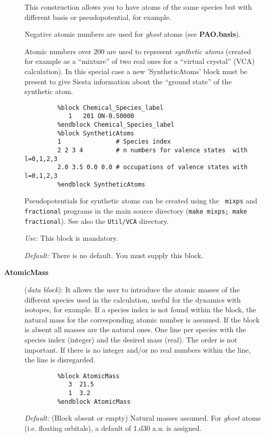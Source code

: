 \documentclass[11pt]{article}
\begin{document}
\begin{description}
This construction allows you to have atoms of the same species but with
different basis or pseudopotential, for example.

Negative atomic numbers are used for {\it ghost} atoms 
(see {\bf PAO.basis}).

Atomic numbers over 200 are used to represent {\it synthetic atoms}
 (created for example as a ``mixture'' of two
real ones for a ``virtual crystal'' (VCA) calculation). In
this special case a new 'SyntheticAtoms' block
  must be present to give
{\sc Siesta} information about the ``ground state'' of the synthetic
atom.

\begin{verbatim}
         %block Chemical_Species_label
            1   201 ON-0.50000
         %endblock Chemical_Species_label
         %block SyntheticAtoms
         1               # Species index
         2 2 3 4         # n numbers for valence states  with l=0,1,2,3
         2.0 3.5 0.0 0.0 # occupations of valence states with l=0,1,2,3
         %endblock SyntheticAtoms
\end{verbatim}

Pseudopotentials for synthetic atoms can be created using the {\tt
  mixps} and  {\tt fractional} programs
 in the main source directory
  ({\tt make mixps; make fractional}). See also the {\tt Util/VCA} directory.

{\it Use:} This block is mandatory.

{\it Default:} There is no default. You must supply this block.



\item[{\bf AtomicMass}] ({\it data block}): 
It allows the user to introduce
the atomic masses of the different species used in the calculation, useful
for the dynamics with isotopes, for example. If
a species index is not found within the block, the natural mass for the 
corresponding atomic number is assumed. If the block is absent all masses
are the natural ones. One line per species with the species index (integer)
and the desired mass (real). The order is not important. If there is no 
integer and/or no real numbers within the line, the line is disregarded.

\begin{verbatim}
         %block AtomicMass
            3  21.5
            1  3.2 
         %endblock AtomicMass
\end{verbatim}

{\it Default:} (Block absent or empty) Natural masses assumed. For 
{\it ghost} atoms (i.e. floating orbitals), a default of 1.d30 a.u. is 
assigned.


\end{description}
\end{document}
